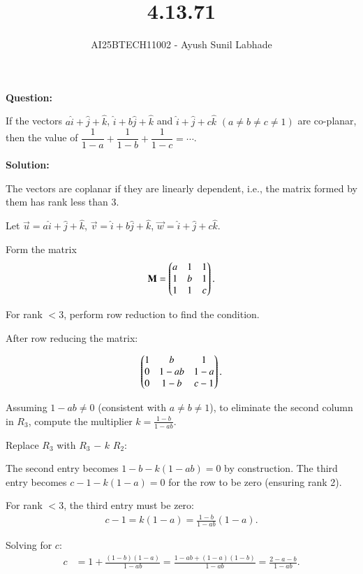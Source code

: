 \documentclass[journal,12pt,onecolumn]{IEEEtran}
\begin{document}
\title{4.13.71}
\author{AI25BTECH11002 - Ayush Sunil Labhade}
{\let\newpage\relax\maketitle}


\textbf{Question:}

If the vectors \(a \hat{i} + \hat{j} + \hat{k}\), \(\hat{i} + b \hat{j} + \hat{k}\) and \(\hat{i} + \hat{j} + c \hat{k}\) \((a \neq b \neq c \neq 1)\) are co-planar, then
the value of \(\dfrac{1}{1-a} + \dfrac{1}{1-b} + \dfrac{1}{1-c} = \dotsb\).

\textbf{Solution:}

The vectors are coplanar if they are linearly dependent, i.e., the matrix formed by them has rank less than 3.

Let \(\vec{u} = a \hat{i} + \hat{j} + \hat{k}\), \(\vec{v} = \hat{i} + b \hat{j} + \hat{k}\), \(\vec{w} = \hat{i} + \hat{j} + c \hat{k}\).

Form the matrix
\begin{align}
	\mathbf{M} = \begin{pmatrix}a & 1 & 1 \\ 1 & b & 1 \\ 1 & 1 & c\end{pmatrix}.
\end{align}

For rank $<3$, perform row reduction to find the condition.

After row reducing the matrix:

\begin{align}
\begin{pmatrix}1 & b & 1 \\ 0 & 1 - ab & 1 - a \\ 0 & 1 - b & c - 1\end{pmatrix}.
\end{align}

Assuming \(1 - ab \neq 0\) (consistent with \(a \neq b \neq 1\)), to eliminate the second column in $R_3$, compute the multiplier \(k = \frac{1 - b}{1 - ab}\).

Replace $R_3$ with $R_3$ $-$ \(k\) $R_2$:

The second entry becomes \(1 - b - k (1 - ab) = 0\) by construction.
The third entry becomes \(c - 1 - k (1 - a) = 0\) for the row to be zero (ensuring rank 2).

For rank $<3$, the third entry must be zero:
\begin{align}
c - 1 = k (1 - a) = \frac{1 - b}{1 - ab} (1 - a).
\end{align}

Solving for \(c\):
\begin{align}
c &= 1 + \frac{(1 - b)(1 - a)}{1 - ab} = \frac{1 - ab + (1 - a)(1 - b)}{1 - ab} = \frac{2 - a - b}{1 - ab}.
\end{align}
\end{document}
